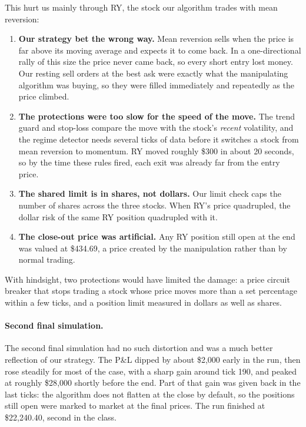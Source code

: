 \documentclass{article}
\begin{document}
\noindent This hurt us mainly through RY, the stock our algorithm trades with mean reversion:
\begin{enumerate}
  \item \textbf{Our strategy bet the wrong way.} Mean reversion sells when the price is far above its moving average and expects it to come back. In a one-directional rally of this size the price never came back, so every short entry lost money. Our resting sell orders at the best ask were exactly what the manipulating algorithm was buying, so they were filled immediately and repeatedly as the price climbed.
  \item \textbf{The protections were too slow for the speed of the move.} The trend guard and stop-loss compare the move with the stock's \emph{recent} volatility, and the regime detector needs several ticks of data before it switches a stock from mean reversion to momentum. RY moved roughly \$300 in about 20 seconds, so by the time these rules fired, each exit was already far from the entry price.
  \item \textbf{The shared limit is in shares, not dollars.} Our limit check caps the number of shares across the three stocks. When RY's price quadrupled, the dollar risk of the same RY position quadrupled with it.
  \item \textbf{The close-out price was artificial.} Any RY position still open at the end was valued at \$434.69, a price created by the manipulation rather than by normal trading.
\end{enumerate}

\noindent With hindsight, two protections would have limited the damage: a price circuit breaker that stops trading a stock whose price moves more than a set percentage within a few ticks, and a position limit measured in dollars as well as shares.

\paragraph{Second final simulation.}
The second final simulation had no such distortion and was a much better reflection of our strategy. The P\&L dipped by about \$2{,}000 early in the run, then rose steadily for most of the case, with a sharp gain around tick 190, and peaked at roughly \$28{,}000 shortly before the end. Part of that gain was given back in the last ticks: the algorithm does not flatten at the close by default, so the positions still open were marked to market at the final prices. The run finished at \$22{,}240.40, second in the class.
\end{document}
